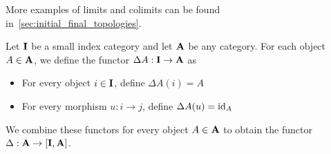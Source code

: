 \begin{note}
  More examples of limits and colimits can be found in~\cref{sec:initial_final_topologies}.
\end{note}

\begin{definition}\label{def:diagonal_functor}\cite[143]{Leinster2014}
  Let $\operatorname{\mathbf{I}}$ be a small index category and let $\operatorname{\mathbf{A}}$ be any category. For each object $A \in \operatorname{\mathbf{A}}$, we define the functor $\Delta A: \operatorname{\mathbf{I}} \to \operatorname{\mathbf{A}}$ as
  \begin{itemize}
    \item For every object $i \in \operatorname{\mathbf{I}}$, define $\Delta A(i) = A$
    \item For every morphism $u: i \to j$, define $\Delta A(u) = \operatorname{id}_A$
  \end{itemize}

  We combine these functors for every object $A \in \operatorname{\mathbf{A}}$ to obtain the functor $\Delta: \operatorname{\mathbf{A}} \to [\operatorname{\mathbf{I}}, \operatorname{\mathbf{A}}]$.
\end{definition}

